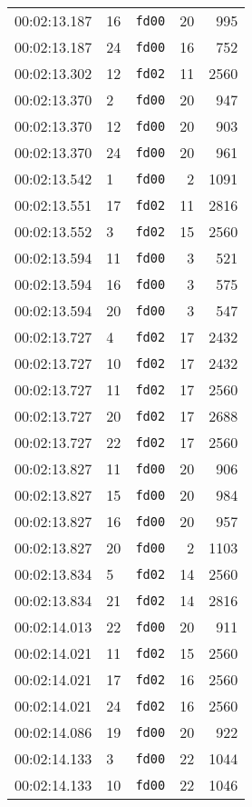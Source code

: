 \documentclass{article}
\begin{document}
\begin{longtable}{lllrr}
00:02:13.187 & 16 & \texttt{fd00} & 20 & 995 \\
00:02:13.187 & 24 & \texttt{fd00} & 16 & 752 \\
00:02:13.302 & 12 & \texttt{fd02} & 11 & 2560 \\
00:02:13.370 & 2 & \texttt{fd00} & 20 & 947 \\
00:02:13.370 & 12 & \texttt{fd00} & 20 & 903 \\
00:02:13.370 & 24 & \texttt{fd00} & 20 & 961 \\
00:02:13.542 & 1 & \texttt{fd00} & 2 & 1091 \\
00:02:13.551 & 17 & \texttt{fd02} & 11 & 2816 \\
00:02:13.552 & 3 & \texttt{fd02} & 15 & 2560 \\
00:02:13.594 & 11 & \texttt{fd00} & 3 & 521 \\
00:02:13.594 & 16 & \texttt{fd00} & 3 & 575 \\
00:02:13.594 & 20 & \texttt{fd00} & 3 & 547 \\
00:02:13.727 & 4 & \texttt{fd02} & 17 & 2432 \\
00:02:13.727 & 10 & \texttt{fd02} & 17 & 2432 \\
00:02:13.727 & 11 & \texttt{fd02} & 17 & 2560 \\
00:02:13.727 & 20 & \texttt{fd02} & 17 & 2688 \\
00:02:13.727 & 22 & \texttt{fd02} & 17 & 2560 \\
00:02:13.827 & 11 & \texttt{fd00} & 20 & 906 \\
00:02:13.827 & 15 & \texttt{fd00} & 20 & 984 \\
00:02:13.827 & 16 & \texttt{fd00} & 20 & 957 \\
00:02:13.827 & 20 & \texttt{fd00} & 2 & 1103 \\
00:02:13.834 & 5 & \texttt{fd02} & 14 & 2560 \\
00:02:13.834 & 21 & \texttt{fd02} & 14 & 2816 \\
00:02:14.013 & 22 & \texttt{fd00} & 20 & 911 \\
00:02:14.021 & 11 & \texttt{fd02} & 15 & 2560 \\
00:02:14.021 & 17 & \texttt{fd02} & 16 & 2560 \\
00:02:14.021 & 24 & \texttt{fd02} & 16 & 2560 \\
00:02:14.086 & 19 & \texttt{fd00} & 20 & 922 \\
00:02:14.133 & 3 & \texttt{fd00} & 22 & 1044 \\
00:02:14.133 & 10 & \texttt{fd00} & 22 & 1046 \\

\end{longtable}
\end{document}
